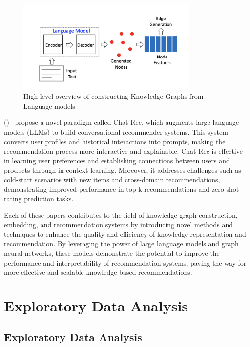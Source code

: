 \documentclass[11pt,a4paper,openany,oneside,titlepage]{article}
\newcommand{\citewithnumber}[1]{%
  \citeauthor{#1} (\citeyear{#1})~\cite{#1}%
}
\begin{document}
\begin{figure}[H]
  \centering
  \includegraphics[width=0.8\textwidth]{img/Idea.png}
  \caption{High level overview of constructing Knowledge Graphs from Language models}
  \label{fig:kg_construction}
  \end{figure}
  
\citewithnumber {gao2023chatrec} propose a novel paradigm called Chat-Rec, which augments large language models (LLMs) to build conversational recommender systems. This system converts user profiles and historical interactions into prompts, making the recommendation process more interactive and explainable. Chat-Rec is effective in learning user preferences and establishing connections between users and products through in-context learning. Moreover, it addresses challenges such as cold-start scenarios with new items and cross-domain recommendations, demonstrating improved performance in top-k recommendations and zero-shot rating prediction tasks.

Each of these papers contributes to the field of knowledge graph construction, embedding, and recommendation systems by introducing novel methods and techniques to enhance the quality and efficiency of knowledge representation and recommendation. By leveraging the power of large language models and graph neural networks, these models demonstrate the potential to improve the performance and interpretability of recommendation systems, paving the way for more effective and scalable knowledge-based recommendations.

\section{Exploratory Data Analysis}

\subsection{Exploratory Data Analysis}
\end{document}
